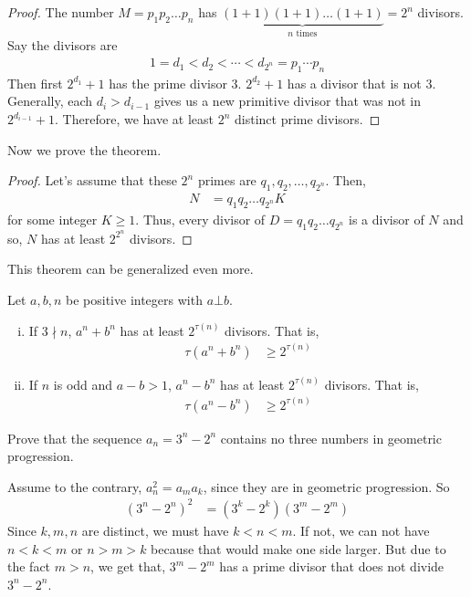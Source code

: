 	\begin{proof}
		The number $M=p_1p_2\dots p_n$ has $\underbrace{(1+1)(1+1)\dots(1+1)}_{n\text{ times}}=2^n$ divisors. Say the divisors are
			\begin{align*}
				1=d_1<d_2<\cdots<d_{2^n}=p_1\cdots p_n
			\end{align*}
		Then first $2^{d_1}+1$ has the prime divisor $3$. $2^{d_2}+1$ has a divisor that is not $3$. Generally, each $d_i>d_{i-1}$ gives us a new primitive divisor that was not in $2^{d_{i-1}}+1$. Therefore, we have at least $2^n$ distinct prime divisors.
	\end{proof}
Now we prove the theorem.
	\begin{proof}
		Let's assume that these $2^n$ primes are $q_1, q_2, \dots, q_{2^n}$. Then,
			\begin{align*}
				N & = q_1q_2\dots q_{2^n}K
			\end{align*}
		for some integer $K\geq1$. Thus, every divisor of $D=q_1q_2\dots q_{2^n}$ is a divisor of $N$ and so, $N$ has at least $2^{2^n}$ divisors.
	\end{proof}
This theorem can be generalized even more.
	\begin{theorem}
		Let $a,b,n$ be positive integers with $a\bot b$.
			\begin{enumerate}[i.]
				\item If $3\nmid n$, $a^n+b^n$ has at least $2^{\tau(n)}$ divisors. That is,
					\begin{align*}
						\tau(a^n+b^n) &\geq2^{\tau(n)}
					\end{align*}
				\item If $n$ is odd and $a-b>1$, $a^n-b^n$ has at least $2^{\tau(n)}$ divisors. That is,
					\begin{align*}
						\tau(a^n-b^n) & \geq2^{\tau(n)}
					\end{align*}
			\end{enumerate}
	\end{theorem}

	\begin{problem}
		Prove that the sequence $a_n = 3^n - 2^n$ contains no three numbers in geometric progression.
	\end{problem}

	\begin{solution}
		Assume to the contrary, $a_n^2=a_ma_k$, since they are in geometric progression. So
			\begin{align*}
				(3^n-2^n)^2 & = (3^k-2^k)(3^m-2^m)
			\end{align*}
		Since $k,m,n$ are distinct, we must have $k<n<m$. If not, we can not have $n<k<m$ or $n>m>k$ because that would make one side larger. But due to the fact $m>n$, we get that, $3^m-2^m$ has a prime divisor that does not divide $3^n-2^n$.
	\end{solution}

